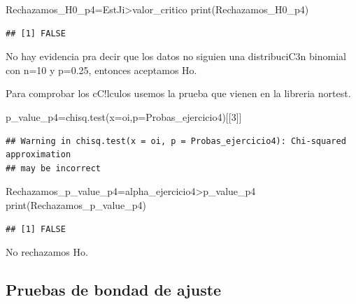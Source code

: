 \documentclass[
]{article}
\newenvironment{Shaded}{\begin{snugshade}}{\end{snugshade}}
\newcommand{\AttributeTok}[1]{\textcolor[rgb]{0.77,0.63,0.00}{#1}}
\newcommand{\DecValTok}[1]{\textcolor[rgb]{0.00,0.00,0.81}{#1}}
\newcommand{\FunctionTok}[1]{\textcolor[rgb]{0.00,0.00,0.00}{#1}}
\newcommand{\NormalTok}[1]{#1}
\newcommand{\OtherTok}[1]{\textcolor[rgb]{0.56,0.35,0.01}{#1}}
\newcommand{\SpecialCharTok}[1]{\textcolor[rgb]{0.00,0.00,0.00}{#1}}
\begin{document}
\begin{Shaded}
\begin{Highlighting}[]
\NormalTok{Rechazamos\_H0\_p4}\OtherTok{=}\NormalTok{EstJi}\SpecialCharTok{\textgreater{}}\NormalTok{valor\_critico}
\FunctionTok{print}\NormalTok{(Rechazamos\_H0\_p4)}
\end{Highlighting}
\end{Shaded}

\begin{verbatim}
## [1] FALSE
\end{verbatim}

No hay evidencia pra decir que los datos no siguien una distribuciC3n
binomial con n=10 y p=0.25, entonces aceptamos Ho.

Para comprobar los cC!lculos usemos la prueba que vienen en la libreria
nortest.

\begin{Shaded}
\begin{Highlighting}[]
\NormalTok{p\_value\_p4}\OtherTok{=}\FunctionTok{chisq.test}\NormalTok{(}\AttributeTok{x=}\NormalTok{oi,}\AttributeTok{p=}\NormalTok{Probas\_ejercicio4)[[}\DecValTok{3}\NormalTok{]]}
\end{Highlighting}
\end{Shaded}

\begin{verbatim}
## Warning in chisq.test(x = oi, p = Probas_ejercicio4): Chi-squared approximation
## may be incorrect
\end{verbatim}

\begin{Shaded}
\begin{Highlighting}[]
\NormalTok{Rechazamos\_p\_value\_p4}\OtherTok{=}\NormalTok{alpha\_ejercicio4}\SpecialCharTok{\textgreater{}}\NormalTok{p\_value\_p4}
\FunctionTok{print}\NormalTok{(Rechazamos\_p\_value\_p4)}
\end{Highlighting}
\end{Shaded}

\begin{verbatim}
## [1] FALSE
\end{verbatim}

No rechazamos Ho.

\hypertarget{pruebas-de-bondad-de-ajuste-2}{%
\subsection{Pruebas de bondad de
ajuste}\label{pruebas-de-bondad-de-ajuste-2}}
\end{document}
